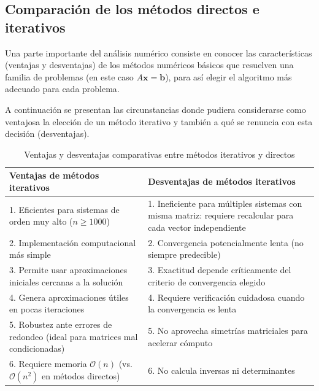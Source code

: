 \documentclass[12pt,letterpaper]{article}
\theoremstyle{definition}
\theoremstyle{plain}
\theoremstyle{remark}
\begin{document}
\subsection{Comparación de los métodos directos e iterativos}

Una parte importante del análisis numérico consiste en conocer las características (ventajas y desventajas) de los métodos numéricos básicos que resuelven una familia de problemas (en este caso $A\mathbf{x} = \mathbf{b}$), para así elegir el algoritmo más adecuado para cada problema.

A continuación se presentan las circunstancias donde pudiera considerarse como ventajosa la elección de un método iterativo y también a qué se renuncia con esta decisión (desventajas).

\begin{table}[htbp]
\centering
\caption{Ventajas y desventajas comparativas entre métodos iterativos y directos}
\label{tab:3.6}
\begin{tabular}{|>{\raggedright\arraybackslash}p{}|>{\raggedright\arraybackslash}p{}|}
\hline
\rowcolor{azulclaro}
\textbf{\color{black}Ventajas de métodos iterativos} & \textbf{\color{black}Desventajas de métodos iterativos} \\
\hline
\cellcolor{azulclaro!50}1. Eficientes para sistemas de orden muy alto ($n \geq 1000$) & \cellcolor{verdeclaro!50}1. Ineficiente para múltiples sistemas con misma matriz: requiere recalcular para cada vector independiente \\ 
\hline
\cellcolor{azulclaro!50}2. Implementación computacional más simple & \cellcolor{verdeclaro!50}2. Convergencia potencialmente lenta (no siempre predecible) \\
\hline
\cellcolor{azulclaro!50}3. Permite usar aproximaciones iniciales cercanas a la solución & \cellcolor{verdeclaro!50}3. Exactitud depende críticamente del criterio de convergencia elegido \\
\hline
\cellcolor{azulclaro!50}4. Genera aproximaciones útiles en pocas iteraciones & \cellcolor{verdeclaro!50}4. Requiere verificación cuidadosa cuando la convergencia es lenta \\
\hline
\cellcolor{azulclaro!50}5. Robustez ante errores de redondeo (ideal para matrices mal condicionadas) & \cellcolor{verdeclaro!50}5. No aprovecha simetrías matriciales para acelerar cómputo \\
\hline
\cellcolor{azulclaro!50}6. Requiere memoria $\mathcal{O}(n)$ (vs. $\mathcal{O}(n^2)$ en métodos directos) & \cellcolor{verdeclaro!50}6. No calcula inversas ni determinantes \\
\hline
\end{tabular}
\end{table}
\end{document}

